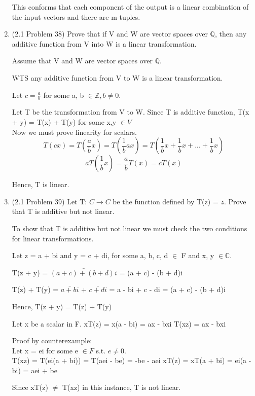 \documentclass[12pt]{article}
\begin{document}
\begin{enumerate}
    This conforms that each component of the output is a linear combination of the input vectors and there are m-tuples.
    
    \qedsymbol{}
    
    \item (2.1 Problem 38)
    Prove that if V and W are vector spaces over $\mathbb{Q}$, then any additive function from V into W is a linear transformation. 

    Assume that V and W are vector spaces over $\mathbb{Q}$. 

    WTS any additive function from V to W is a linear transformation. 

    Let $c = \frac{a}{b}$ for some a, b $\in \mathbb{Z}, b \neq 0$. 

    Let T be the transformation from V to W. Since T is additive function, T(x + y) = T(x) + T(y) for some x,y $\in V$ \\ 

    Now we must prove linearity for scalars.
    \begin{equation}
        T(cx) = T(\frac{a}{b}x) = T(\frac{1}{b}ax) = T(\frac{1}{b}x + \frac{1}{b}x + ... + \frac{1}{b}x) 
    \end{equation} 
    \begin{equation}
        aT(\frac{1}{b}x) = \frac{a}{b}T(x) = cT(x)
    \end{equation}

    Hence, T is linear. \qedsymbol{}
     
    
    \item (2.1 Problem 39) 
    Let T: $C \xrightarrow{} C$ be the function defined by T(z) = $\bar{z}$. Prove that T is additive but not linear. 

    To show that T is additive but not linear we must check the two conditions for linear transformations. 
    
    Let z = a + bi and y = c + di, for some a, b, c, d $\in$ F and x, y $\in \mathbb{C}$. 

    T(z + y) = $\bar{(a + c) + (b + d)i}$ = (a + c) - (b + d)i 

    T(z) + T(y) = $\bar{a + bi}$ + $\bar{c + di}$ = a - bi + c - di = 
    (a + c) - (b + d)i 
    
    Hence, T(z + y) = T(z) + T(y) 

    Let x be a scalar in F. 
    xT(z) = x(a - bi) = ax - bxi 
    T(xz) = ax - bxi 

    Proof by counterexample: \\
    Let x = ei for some e $\in F$ s.t. $e \neq 0$. \\
    T(xz) = T(ei(a + bi)) = T(aei - be) = -be - aei 
    xT(z) = xT(a + bi) = ei(a - bi) = aei + be

    Since xT(z) $\neq$ T(xz) in this instance, T is not linear. 
    \qedsymbol
    
    
\end{enumerate}
\end{document}
